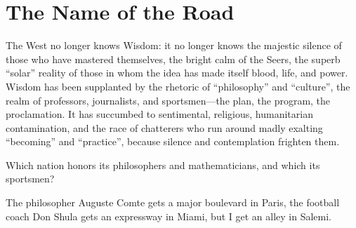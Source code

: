 \section{The Name of the Road}

\begin{quotex}
The West no longer knows Wisdom: it no longer knows the majestic silence of those who have mastered themselves, the bright calm of the Seers, the superb ``solar'' reality of those in whom the idea has made itself blood, life, and power. Wisdom has been supplanted by the rhetoric of ``philosophy'' and ``culture'', the realm of professors, journalists, and sportsmen---the plan, the program, the proclamation. It has succumbed to sentimental, religious, humanitarian contamination, and the race of chatterers who run around madly exalting ``becoming'' and ``practice'', because silence and contemplation frighten them.

\end{quotex}

Which nation honors its philosophers and mathematicians, and which its sportsmen?

The philosopher Auguste Comte gets a major boulevard in Paris, the football coach Don Shula gets an expressway in Miami, but I get an alley in Salemi.



